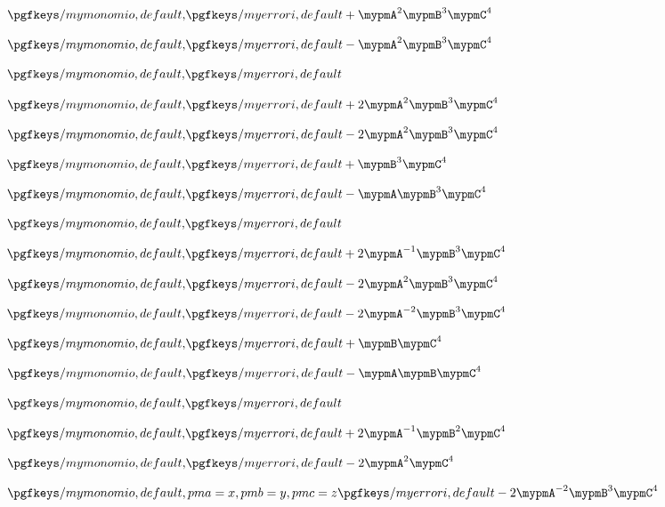 \documentclass[10pt,a4paper]{article}
\begin{document}
$\PM{1}{2}{3}{4}$

$\PM{-1}{2}{3}{4}$

$\PM{0}{2}{3}{4}$

$\PM{2}{2}{3}{4}$

$\PM{-2}{2}{3}{4}$

$\PM{1}{0}{3}{4}$

$\PM{-1}{1}{3}{4}$

$\PM{0}{-1}{3}{4}$

$\PM{2}{-1}{3}{4}$

$\PM{-2}{2}{3}{4}$

$\PM{-2}{-2}{3}{4}$

$\PM{1}{0}{1}{4}$

$\PM{-1}{1}{1}{4}$

$\PM{0}{-1}{-1}{4}$

$\PM{2}{-1}{2}{4}$

$\PM{-2}{2}{0}{4}$

$\PM[pma = x, pmb = y, pmc =z]{-2}{-2}{3}{4}$
\end{document}
